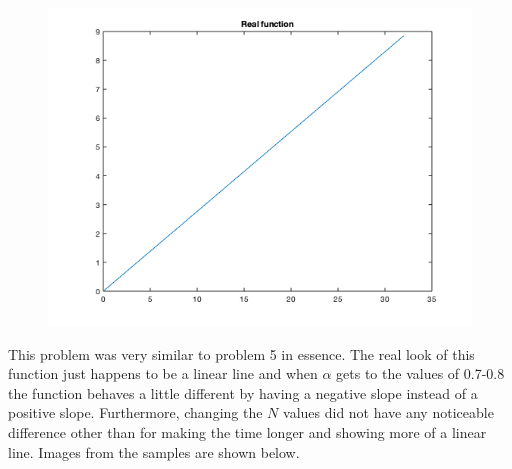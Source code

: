 \documentclass[12pt]{article}
\begin{document}
\begin{figure}[h!]
    \centering
    {{\includegraphics[width=15cm]{problem_6.png}}}%
    \qquad
    \caption{ }%
    \label{fig:example}%
\end{figure}

This problem was very similar to problem 5 in essence. The real look of this function just happens to be a linear line and when $\alpha$ gets to the values of 0.7-0.8 the function behaves a little different by having a negative slope instead of a positive slope. Furthermore, changing the $N$ values did not have any noticeable difference other than for making the time longer and showing more of a linear line. Images from the samples are shown below.
\end{document}

